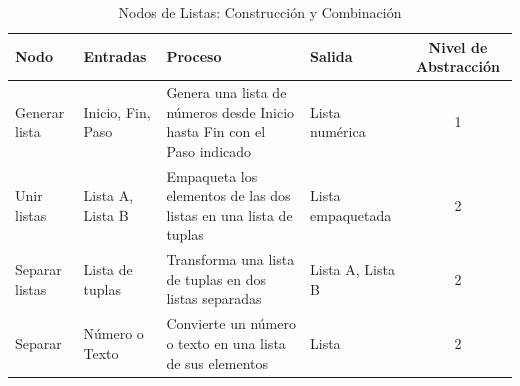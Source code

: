 \begin{table}[H]
    \centering
    \caption{Nodos de Listas: Construcción y Combinación}
    \begin{tabularx}{\textwidth}{ l l X X c }
        \hline
        \textbf{Nodo}  & \textbf{Entradas} & \textbf{Proceso}                                                        & \textbf{Salida}   & \textbf{Nivel de Abstracción} \\ \hline
        Generar lista  & Inicio, Fin, Paso & Genera una lista de números desde Inicio hasta Fin con el Paso indicado & Lista numérica    & 1                             \\
        Unir listas    & Lista A, Lista B  & Empaqueta los elementos de las dos listas en una lista de tuplas        & Lista empaquetada & 2                             \\
        Separar listas & Lista de tuplas   & Transforma una lista de tuplas en dos listas separadas                  & Lista A, Lista B  & 2                             \\
        Separar        & Número o Texto    & Convierte un número o texto en una lista de sus elementos               & Lista             & 2                             \\
        \hline
    \end{tabularx}
\end{table}


